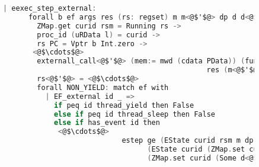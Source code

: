 \begin{figure}
\begin{lstlisting}[language=C]
  | eexec_step_external:
      forall b ef args res (rs: regset) m m<@$'$@> dp d d<@$'$@> ds<@$'$@> t rs<@$'$@> curid rsm l l<@$'$@>,
        ZMap.get curid rsm = Running rs ->
        proc_id (uRData l) = curid ->
        rs PC = Vptr b Int.zero ->
       <@$\cdots$@>
        externall_call<@$'$@> (mem:= mwd (cdata PData)) (fun _ => True) ef ge args (m, (uRData l, d)) t 
                                                res (m<@$'$@>, (ds<@$'$@>,d<@$'$@>)) ->
        rs<@$'$@> = <@$\cdots$@>
        forall NON_YIELD: match ef with
          | EF_external id _ => 
            if peq id thread_yield then False
            else if peq id thread_sleep then False
            else if has_event id then
             <@$\cdots$@>
                            estep ge (EState curid rsm m dp l) t 
                                  (EState curid (ZMap.set curid (Running rs<@$'$@>) rsm) m<@$'$@> 
                                  (ZMap.set curid (Some d<@$'$@>) dp) l<@$'$@>)
\end{lstlisting}
\end{figure}
%
